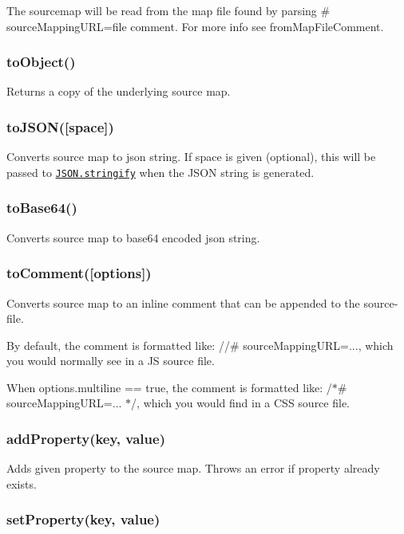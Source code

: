 The sourcemap will be read from the map file found by parsing {\ttfamily \# source\+Mapping\+U\+RL=file} comment. For more info see from\+Map\+File\+Comment.

\subsubsection*{to\+Object()}

Returns a copy of the underlying source map.

\subsubsection*{to\+J\+S\+O\+N(\mbox{[}space\mbox{]})}

Converts source map to json string. If {\ttfamily space} is given (optional), this will be passed to \href{https://developer.mozilla.org/en-US/docs/JavaScript/Reference/Global_Objects/JSON/stringify}{\tt J\+S\+O\+N.\+stringify} when the J\+S\+ON string is generated.

\subsubsection*{to\+Base64()}

Converts source map to base64 encoded json string.

\subsubsection*{to\+Comment(\mbox{[}options\mbox{]})}

Converts source map to an inline comment that can be appended to the source-\/file.

By default, the comment is formatted like\+: {\ttfamily //\# source\+Mapping\+U\+RL=...}, which you would normally see in a JS source file.

When {\ttfamily options.\+multiline == true}, the comment is formatted like\+: {\ttfamily /$\ast$\# source\+Mapping\+U\+RL=... $\ast$/}, which you would find in a C\+SS source file.

\subsubsection*{add\+Property(key, value)}

Adds given property to the source map. Throws an error if property already exists.

\subsubsection*{set\+Property(key, value)}

